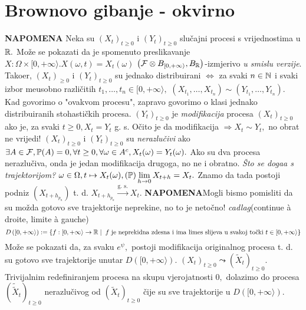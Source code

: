 \documentclass{article}
\begin{document}
\section{Brownovo gibanje - okvirno}
\textbf{NAPOMENA}\newline
Neka su \((X_t)_{t\ge0}\) i \((Y_t)_{t\ge0}\) slučajni procesi s vrijednostima u \(\Bbb R.\) Može se pokazati da je spomenuto preslikavanje \(X:\Omega\times[0,+\infty\rangle. X(\omega,t)=X_t(\omega)\) \(\left(\mathcal F\otimes B_{[0,+\infty\rangle},B_\Bbb R\right)\)-izmjerivo \emph{u smislu verzije}. Tako\dj{}er, \((X_t)_{\ge0}\) i \((Y_t)_{t\ge0}\) su jednako distribuirani \(\Leftrightarrow\) za svaki \(n\in\Bbb N\) i svaki izbor me\dj{}usobno različitih \(t_1,\ldots,t_n\in[0,+\infty\rangle,\) \((X_{t_1},\ldots,X_{t_n})\sim(Y_{t_1},\ldots,Y_{t_n}).\) Kad govorimo o "ovakvom procesu", zapravo govorimo o klasi jednako distribuiranih stohastičkih procesa. \((Y_t)_{t\ge0}\) je \emph{modifikacija} procesa \((X_t)_{t\ge0}\) ako je, za svaki \(t\ge0,X_t=Y_t\) g. s. Očito je da modifikacija \(\Rightarrow X_t\sim Y_t,\) no obrat ne vrijedi! \((X_t)_{t\ge0}\) i \((Y_t)_{t\ge0}\) su \emph{nerazlučivi} ako \(\exists A\in\mathcal F,\Bbb P(A)=0,\forall t\ge0,\forall\omega\in A^c,X_t(\omega)=Y_t(\omega).\) Ako su dva procesa nerazlučiva, onda je jedan modifikacija drugoga, no ne i obratno.\newline\newline
\emph{Što se doga\dj{}a s trajektorijom?}\newline
\(\omega\in\Omega,t\mapsto X_t(\omega),(\Bbb P)\lim\limits_{h\to0}X_{t+h}=X_t.\) Znamo da tada postoji podniz \(\left(X_{t+h_{p_n}}\right)\) t. d. \(X_{t+h_{p_n}}\overset{\text{g. s.}}{\longrightarrow}X_t.\)\newline\newline
{}\textbf{NAPOMENA}\newline Mogli bismo pomisliti da su možda gotovo sve trajektorije neprekine, no to je netočno!\newline\newline
\emph{cadlag}(continue \`{a} droite, limite \`{a} gauche) \[D\left([0,+\infty\rangle\right):=\left\{f:[0,+\infty\rangle\to\Bbb R\mid\; f\text{ je neprekidna zdesna i ima limes slijeva u svakoj točki }t\in[0,+\infty\rangle\right\}\] Može se pokazati da, za svaku \(e^\psi,\) postoji modifikacija originalnog procesa t. d. su gotovo sve trajektorije unutar \(D\left([0,+\infty\rangle\right).\) \((X_t)_{t\ge0}\leadsto\left(\tilde X_t\right)_{t\ge0}.\) Trivijalnim redefiniranjem procesa na skupu vjerojatnosti \(0,\) dolazimo do procesa \(\left(\tilde{\tilde X}_t\right)_{t\ge0}\) nerazlučivog od \(\left(\tilde X_t\right)_{t\ge0}\) čije su sve trajektorije u \(D\left([0,+\infty\rangle\right).\)\newline\newline
\end{document}
